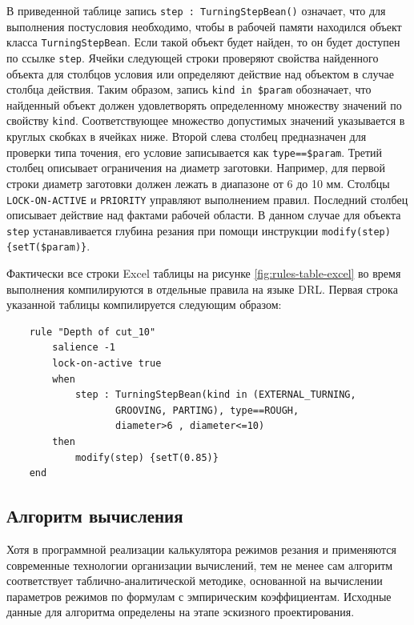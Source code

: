 \documentclass[14pt,oneside,final]{extreport}
\begin{document}
	 В приведенной таблице запись \texttt{step : TurningStepBean()} означает, что для выполнения постусловия необходимо, чтобы в рабочей памяти находился объект класса \texttt{TurningStepBean}. Если такой объект будет найден, то он будет доступен по ссылке \texttt{step}. Ячейки следующей строки проверяют свойства найденного объекта для столбцов условия или определяют действие над объектом в случае столбца действия. Таким образом, запись \texttt{kind in \$param} обозначает, что найденный объект должен удовлетворять определенному множеству значений по свойству \texttt{kind}. Соответствующее множество допустимых значений указывается в круглых скобках в ячейках ниже. Второй слева столбец предназначен для проверки типа точения, его условие записывается как \texttt{type==\$param}. Третий столбец описывает ограничения на диаметр заготовки. Например, для первой строки диаметр заготовки должен лежать в диапазоне от 6 до 10 мм. Столбцы \texttt{LOCK-ON-ACTIVE} и \texttt{PRIORITY} управляют выполнением правил. Последний столбец описывает действие над фактами рабочей области. В данном случае для объекта \texttt{step} устанавливается глубина резания при помощи инструкции \texttt{modify(step)\{setT(\$param)\}}. 
	 
	 Фактически все строки Excel таблицы на рисунке \ref{fig:rules-table-excel} во время выполнения компилируются в отдельные правила на языке DRL. Первая строка указанной таблицы компилируется следующим образом:
	\vspace{0.5cm}
	\begin{lstlisting} 
	rule "Depth of cut_10"
		salience -1
		lock-on-active true
		when
			step : TurningStepBean(kind in (EXTERNAL_TURNING, 
				   GROOVING, PARTING), type==ROUGH, 
				   diameter>6 , diameter<=10)
		then
			modify(step) {setT(0.85)}
	end
	\end{lstlisting}
	
	\subsection{Алгоритм вычисления}		
	Хотя в программной реализации калькулятора режимов резания и применяются современные технологии организации вычислений, тем не менее сам алгоритм соответствует таблично-аналитической методике, основанной на вычислении параметров режимов по формулам с эмпирическим коэффициентам. Исходные данные для алгоритма определены на этапе эскизного проектирования.
	
\end{document}
